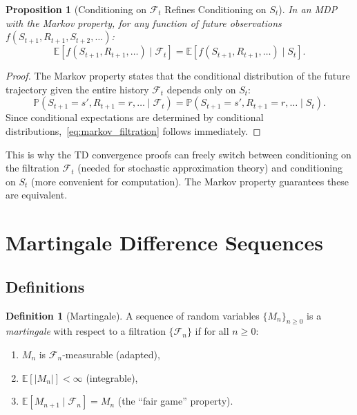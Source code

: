 \documentclass[11pt,a4paper]{article}
\theoremstyle{definition}
\newtheorem{definition}{Definition}[section]
\theoremstyle{plain}
\newtheorem{proposition}[theorem]{Proposition}
\theoremstyle{remark}
\newcommand{\E}{\mathbb{E}}
\newcommand{\Prob}{\mathbb{P}}
\begin{document}
\begin{proposition}[Conditioning on $\mathcal{F}_t$ Refines Conditioning on $S_t$]
\label{prop:filtration_refine}
In an MDP with the Markov property, for any function of future observations $f(S_{t+1}, R_{t+1}, S_{t+2}, \ldots)$:
\begin{equation}
    \E[f(S_{t+1}, R_{t+1}, \ldots) \mid \mathcal{F}_t] = \E[f(S_{t+1}, R_{t+1}, \ldots) \mid S_t].
    \label{eq:markov_filtration}
\end{equation}
\end{proposition}

\begin{proof}
The Markov property states that the conditional distribution of the future trajectory given the entire history $\mathcal{F}_t$ depends only on $S_t$:
\begin{equation}
    \Prob(S_{t+1} = s', R_{t+1} = r, \ldots \mid \mathcal{F}_t) = \Prob(S_{t+1} = s', R_{t+1} = r, \ldots \mid S_t).
\end{equation}
Since conditional expectations are determined by conditional distributions,~\eqref{eq:markov_filtration} follows immediately.
\end{proof}

\begin{tdconnection}
This is why the TD convergence proofs can freely switch between conditioning on the filtration $\mathcal{F}_t$ (needed for stochastic approximation theory) and conditioning on $S_t$ (more convenient for computation). The Markov property guarantees these are equivalent.
\end{tdconnection}

\section{Martingale Difference Sequences}
\label{sec:mds}

\subsection{Definitions}
\label{subsec:mds_def}

\begin{definition}[Martingale]
\label{def:martingale}
A sequence of random variables $\{M_n\}_{n \geq 0}$ is a \emph{martingale} with respect to a filtration $\{\mathcal{F}_n\}$ if for all $n \geq 0$:
\begin{enumerate}[nosep]
    \item $M_n$ is $\mathcal{F}_n$-measurable (adapted),
    \item $\E[|M_n|] < \infty$ (integrable),
    \item $\E[M_{n+1} \mid \mathcal{F}_n] = M_n$ (the ``fair game'' property).
\end{enumerate}
\end{definition}
\end{document}
